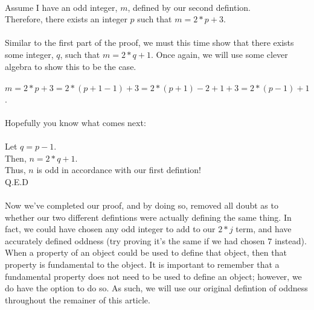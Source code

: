 \documentclass[a4paper,12pt]{article}
\begin{document}
\\
Assume I have an odd integer, $m$, defined by our second defintion.\\
Therefore, there exists an integer $p$ such that $m = 2*p + 3$.\\
\\
Similar to the first part of the proof, we must this time show that there exists some integer, $q$, such that $m = 2*q + 1$. Once again, we will use some clever algebra to show this to be the case.\\
\\
$m = 2*p + 3 = 2*(p + 1 - 1) + 3 = 2*(p + 1) - 2+1 + 3 = 2*(p - 1) + 1$.\\
\\
Hopefully you know what comes next:\\
\\
Let $q = p - 1$.\\
Then, $n = 2*q + 1$.\\
Thus, $n$ is odd in accordance with our first defintion!\\
Q.E.D\\
\\
Now we've completed our proof, and by doing so, removed all doubt as to whether our two different defintions were actually defining the same thing. In fact, we could have chosen any odd integer to add to our $2*j$ term, and have accurately defined oddness (try proving it's the same if we had chosen $7$ instead). When a property of an object could be used to define that object, then that property is fundamental to the object. It is important to remember that a fundamental property does not need to be used to define an object; however, we do have the option to do so. As such, we will use our original defintion of oddness throughout the remainer of this article.   
\end{document}
